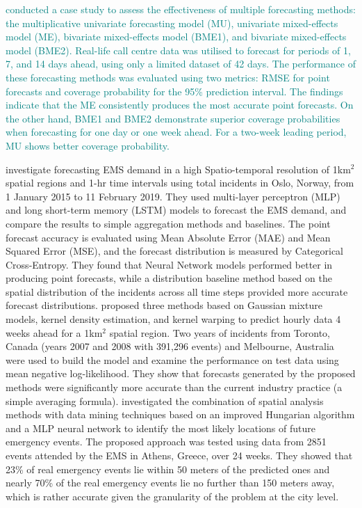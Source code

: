\documentclass[
  authoryear,
  preprint,
  3p]{elsarticle}
\begin{document}
\citet{ibrahim2016modeling}
\textcolor{teal}{conducted a case study to assess the effectiveness of multiple forecasting methods: the multiplicative univariate forecasting model (MU), univariate mixed-effects model (ME), bivariate mixed-effects model (BME1), and bivariate mixed-effects model (BME2). Real-life call centre data was utilised to forecast for periods of 1, 7, and 14 days ahead, using only a limited dataset of 42 days. The performance of these forecasting methods was evaluated using two metrics: RMSE for point forecasts and coverage probability for the 95\% prediction interval. The findings indicate that the ME consistently produces the most accurate point forecasts. On the other hand, BME1 and BME2 demonstrate superior coverage probabilities when forecasting for one day or one week ahead. For a two-week leading period, MU shows better coverage probability.}

\citet{9659837} investigate forecasting EMS demand in a high
Spatio-temporal resolution of 1km\(^2\) spatial regions and 1-hr time
intervals using total incidents in Oslo, Norway, from 1 January 2015 to
11 February 2019. They used multi-layer perceptron (MLP) and long
short-term memory (LSTM) models to forecast the EMS demand, and compare
the results to simple aggregation methods and baselines. The point
forecast accuracy is evaluated using Mean Absolute Error (MAE) and Mean
Squared Error (MSE), and the forecast distribution is measured by
Categorical Cross-Entropy. They found that Neural Network models
performed better in producing point forecasts, while a distribution
baseline method based on the spatial distribution of the incidents
across all time steps provided more accurate forecast distributions.
\citet{zhou2016predictinglit} proposed three methods based on Gaussian
mixture models, kernel density estimation, and kernel warping to predict
hourly data 4 weeks ahead for a 1km\(^2\) spatial region. Two years of
incidents from Toronto, Canada (years 2007 and 2008 with 391,296 events)
and Melbourne, Australia were used to build the model and examine the
performance on test data using mean negative log-likelihood. They show
that forecasts generated by the proposed methods were significantly more
accurate than the current industry practice (a simple averaging
formula). \citet{grekousis2019will} investigated the combination of
spatial analysis methods with data mining techniques based on an
improved Hungarian algorithm and a MLP neural network to identify the
most likely locations of future emergency events. The proposed approach
was tested using data from 2851 events attended by the EMS in Athens,
Greece, over 24 weeks. They showed that 23\% of real emergency events
lie within 50 meters of the predicted ones and nearly 70\% of the real
emergency events lie no further than 150 meters away, which is rather
accurate given the granularity of the problem at the city level.
\end{document}

